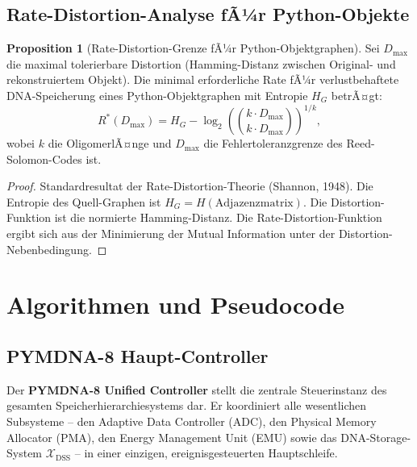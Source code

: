 ﻿\documentclass[a4paper,12pt]{article}
\theoremstyle{definition}
\newtheorem{proposition}{Proposition}[section]
\begin{document}
\subsection{Rate-Distortion-Analyse fÃ¼r Python-Objekte}

\begin{proposition}[Rate-Distortion-Grenze fÃ¼r Python-Objektgraphen]
  \label{prop:rate_distortion}
  Sei $D_{\mathrm{max}}$ die maximal tolerierbare Distortion
  (Hamming-Distanz zwischen Original- und rekonstruiertem Objekt).
  Die minimal erforderliche Rate fÃ¼r verlustbehaftete DNA-Speicherung
  eines Python-Objektgraphen mit Entropie $H_G$ betrÃ¤gt:
  \begin{equation}
    R^*(D_{\mathrm{max}}) = H_G - \log_2
    \left(\binom{k \cdot D_{\mathrm{max}}}{k \cdot D_{\mathrm{max}}}\right)^{1/k},
  \end{equation}
  wobei $k$ die OligomerlÃ¤nge und $D_{\mathrm{max}}$ die
  Fehlertoleranzgrenze des Reed-Solomon-Codes ist.
\end{proposition}

\begin{proof}
  Standardresultat der Rate-Distortion-Theorie (Shannon, 1948).
  Die Entropie des Quell-Graphen ist $H_G = H(\text{Adjazenzmatrix})$.
  Die Distortion-Funktion ist die normierte Hamming-Distanz.
  Die Rate-Distortion-Funktion ergibt sich aus der Minimierung der
  Mutual Information unter der Distortion-Nebenbedingung.
\end{proof}

\section{Algorithmen und Pseudocode}

\subsection{PYMDNA-8 Haupt-Controller}

Der \textbf{PYMDNA-8 Unified Controller} stellt die zentrale Steuerinstanz des gesamten Speicherhierarchiesystems dar. Er koordiniert alle wesentlichen Subsysteme -- den Adaptive Data Controller (ADC), den Physical Memory Allocator (PMA), den Energy Management Unit (EMU) sowie das DNA-Storage-System $\mathcal{X}_{\mathrm{DSS}}$ -- in einer einzigen, ereignisgesteuerten Hauptschleife.
\end{document}
